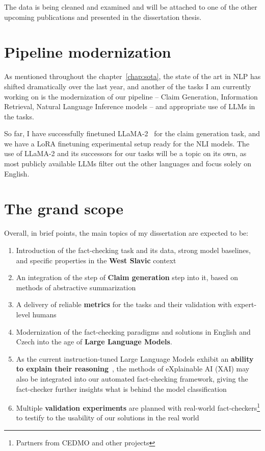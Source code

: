 The data is being cleaned and examined and will be attached to one of the other upcoming publications and presented in the dissertation thesis.

\section{Pipeline modernization}
As mentioned throughout the chapter~\ref{chap:sota}, the state of the art in NLP has shifted dramatically over the last year, and another of the tasks I am currently working on is the modernization of our pipeline -- Claim Generation, Information Retrieval, Natural Language Inference models -- and appropriate use of LLMs in the tasks.

So far, I have successfully finetuned LLaMA-2~\cite{llama2} for the claim generation task, and we have a LoRA finetuning experimental setup ready for the NLI models.
The use of LLaMA-2 and its successors for our tasks will be a topic on its own, as most publicly available LLMs filter out the other languages and focus solely on English.

\section{The grand scope}
Overall, in brief points, the main topics of my dissertation are expected to be:
\begin{enumerate}
    \item Introduction of the fact-checking task and its data, strong model baselines, and specific properties in the \textbf{West Slavic} context
    \item An integration of the step of \textbf{Claim generation} step into it, based on methods of abstractive summarization 
    \item A delivery of reliable \textbf{metrics} for the tasks and their validation with expert-level humans
    \item Modernization of the fact-checking paradigms and solutions in English and Czech into the age of \textbf{Large Language Models}.
    \item As the current instruction-tuned Large Language Models exhibit an \textbf{ability to explain their reasoning}~\cite{SAEED2023110273}, the methods of eXplainable AI (XAI) may also be integrated into our automated fact-checking framework, giving the fact-checker further insights what is behind the model classification
    \item Multiple \textbf{validation experiments} are planned with real-world fact-checkers\footnote{Partners from CEDMO and other projects} to testify to the usability of our solutions in the real world
\end{enumerate}